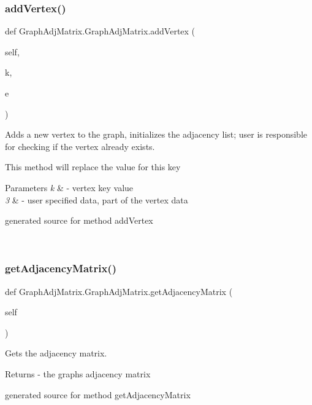 \subsubsection{\texorpdfstring{add\+Vertex()}{addVertex()}}
{\footnotesize\ttfamily def Graph\+Adj\+Matrix.\+Graph\+Adj\+Matrix.\+add\+Vertex (\begin{DoxyParamCaption}\item[{}]{self,  }\item[{}]{k,  }\item[{}]{e }\end{DoxyParamCaption})}



Adds a new vertex to the graph, initializes the adjacency list; user is responsible for checking if the vertex already exists. 

This method will replace the value for this key


\begin{DoxyParams}{Parameters}
{\em k} & -\/ vertex key value \\
\hline
{\em 3} & -\/ user specified data, part of the vertex data\begin{DoxyVerb}generated source for method addVertex \end{DoxyVerb}
 \\
\hline
\end{DoxyParams}
\hypertarget{class_graph_adj_matrix_1_1_graph_adj_matrix_ae5dc33de984eb621e610f1b79be6d65a}{}\label{class_graph_adj_matrix_1_1_graph_adj_matrix_ae5dc33de984eb621e610f1b79be6d65a} 
\subsubsection{\texorpdfstring{get\+Adjacency\+Matrix()}{getAdjacencyMatrix()}}
{\footnotesize\ttfamily def Graph\+Adj\+Matrix.\+Graph\+Adj\+Matrix.\+get\+Adjacency\+Matrix (\begin{DoxyParamCaption}\item[{}]{self }\end{DoxyParamCaption})}



Gets the adjacency matrix. 

\begin{DoxyReturn}{Returns}
-\/ the graph\textquotesingle{}s adjacency matrix\begin{DoxyVerb}generated source for method getAdjacencyMatrix \end{DoxyVerb}
 
\end{DoxyReturn}
\hypertarget{class_graph_adj_matrix_1_1_graph_adj_matrix_aa8d0e8805442fa980d2fa4ec07b29397}{}\label{class_graph_adj_matrix_1_1_graph_adj_matrix_aa8d0e8805442fa980d2fa4ec07b29397} 
